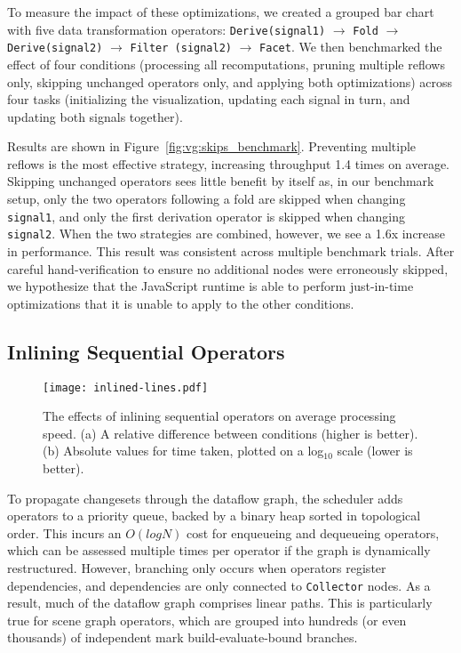 To measure the impact of these optimizations, we created a grouped bar chart
with five data transformation operators: \texttt{Derive(signal1)} $\rightarrow$
\texttt{Fold} $\rightarrow$ \texttt{Derive(signal2)} $\rightarrow$
\texttt{Filter (signal2)} $\rightarrow$ \texttt{Facet}.  We then benchmarked the
effect of four conditions (processing all recomputations, pruning multiple
reflows only, skipping unchanged operators only, and applying both
optimizations) across four tasks (initializing the visualization, updating each
signal in turn, and updating both signals together).

Results are shown in Figure~\ref{fig:vg:skips_benchmark}. Preventing multiple
reflows is the most effective strategy, increasing throughput 1.4 times on
average. Skipping unchanged operators sees little benefit by itself as, in our
benchmark setup, only the two operators following a fold are skipped when
changing \texttt{signal1}, and only the first derivation operator is skipped
when changing \texttt{signal2}. When the two strategies are combined, however,
we see a 1.6x increase in performance. This result was consistent across
multiple benchmark trials. After careful hand-verification to ensure no
additional nodes were erroneously skipped, we hypothesize that the JavaScript
runtime is able to perform just-in-time optimizations that it is unable to apply
to the other conditions.

\subsection{Inlining Sequential Operators}

\begin{figure}[h!]
  \centering
  \texttt{[image: inlined-lines.pdf]}
  \caption{The effects of inlining sequential operators on average processing
speed. (a) A relative difference between conditions (higher is better). (b)
Absolute values for time taken, plotted on a log$_{10}$ scale (lower is better).}
  \label{fig:vg:inline_benchmark}
\end{figure}

To propagate changesets through the dataflow graph, the scheduler adds operators
to a priority queue, backed by a binary heap sorted in topological order. This
incurs an $O(log N)$ cost for enqueueing and dequeueing operators, which can be
assessed multiple times per operator if the graph is dynamically restructured.
However, branching only occurs when operators register dependencies, and
dependencies are only connected to \texttt{Collector} nodes. As a result, much
of the dataflow graph comprises linear paths. This is particularly true for
scene graph operators, which are grouped into hundreds (or even thousands) of
independent mark build-evaluate-bound branches.

